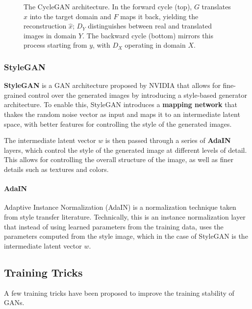 \begin{figure}[H]
    \centering
    \resizebox{0.85\textwidth}{!}{}
    \caption{The CycleGAN architecture. In the forward cycle (top), $G$ translates $x$ into the target domain and $F$ maps it back, yielding the reconstruction $\hat{x}$; $D_Y$ distinguishes between real and translated images in domain $Y$. The backward cycle (bottom) mirrors this process starting from $y$, with $D_X$ operating in domain $X$.}
    \label{fig:cyclegan-architecture}
\end{figure}


\subsubsection{StyleGAN}
\textbf{StyleGAN} is a GAN architecture proposed by NVIDIA that allows for fine-grained control over the generated images by introducing a style-based generator architecture.
To enable this, StyleGAN introduces a \textbf{mapping network} that thakes the random noise vector as input and maps it to an intermediate latent space, with better features for controlling the style of the generated images.

The intermediate latent vector $w$ is then passed through a series of \textbf{AdaIN} layers, which control the style of the generated image at different levels of detail.
This allows for controlling the overall structure of the image, as well as finer details such as textures and colors.

\paragraph{AdaIN}
Adaptive Instance Normalization (AdaIN) is a normalization technique taken from style transfer literature. 
Technically, this is an instance normalization layer that instead of using learned parameters from the training data, 
uses the parameters computed from the style image, which in the case of StyleGAN is the intermediate latent vector $w$.

\subsection{Training Tricks}
A few training tricks have been proposed to improve the training stability of GANs.

